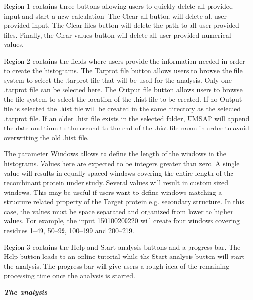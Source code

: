 Region \num{1} contains three buttons allowing users to quickly delete all provided input and start a new calculation. The Clear all button will delete all user provided input. The Clear files button will delete the path to all user provided files. Finally, the Clear values button will delete all user provided numerical values.

Region \num{2} contains the fields where users provide the information needed in order to create the histograms. The Tarprot file button allows users to browse the file system to select the .tarprot file that will be used for the analysis. Only one .tarprot file can be selected here. The Output file button allows users to browse the file system to select the location of the .hist file to be created. If no Output file is selected the .hist file will be created in the same directory as the selected .tarprot file. If an older .hist file exists in the selected folder, UMSAP will append the date and time to the second to the end of the .hist file name in order to avoid overwriting the old .hist file. 

The parameter Windows allows to define the length of the windows in the histograms. Values here are expected to be integers greater than zero. A single value will results in equally spaced windows covering the entire length of the recombinant protein under study. Several values will result in custom sized windows. This may be useful if users want to define windows matching a structure related property of the Target protein e.g. secondary structure. In this case, the values must be space separated and organized from lower to higher values. For example, the input \numlist{1 50 100 200 220} will create four windows covering residues \numrange{1}{49}, \numrange{50}{99}, \numrange{100}{199} and \numrange{200}{219}.

Region \num{3} contains the Help and Start analysis buttons and a progress bar. The Help button leads to an online tutorial while the Start analysis button will start the analysis. The progress bar will give users a rough idea of the remaining processing time once the analysis is started.

\textit{\textbf{The analysis}}

